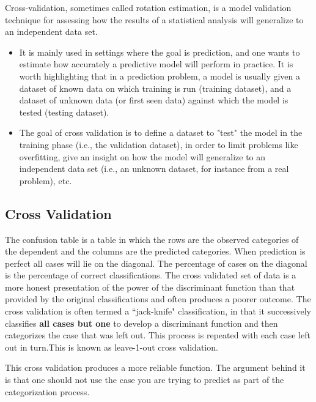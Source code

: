 \documentclass[]{report}
\begin{document}
Cross-validation, sometimes called rotation estimation, is a model validation technique for assessing how the results of a statistical analysis will generalize to an independent data set.
\begin{itemize}
\item It is mainly used in settings where the goal is prediction, and one wants to estimate how accurately a predictive model will perform in practice. It is worth highlighting that in a prediction problem, a model is usually given a dataset of known data on which training is run (training dataset), and a dataset of unknown data (or first seen data) against which the model is tested (testing dataset).
\item The goal of cross validation is to define a dataset to "test" the model in the training phase (i.e., the validation dataset), in order to limit problems like overfitting, give an insight on how the model will generalize to an independent data set (i.e., an unknown dataset, for instance from a real problem), etc.
\end{itemize}

\subsection{Cross Validation}

The confusion
table is a table in which the rows are the observed categories of the dependent and
the columns are the predicted categories. When prediction is perfect all cases will lie on the
diagonal. The percentage of cases on the diagonal is the percentage of correct classifications. 
The cross validated set of data is a more honest presentation of the power of the
discriminant function than that provided by the original classifications and often produces
a poorer outcome. The cross validation is often termed a ``jack-knife" classification, in that
it successively classifies \textbf{all cases but one} to develop a discriminant function and then
categorizes the case that was left out. This process is repeated with each case left out in
turn.This is known as leave-1-out cross validation. 

This cross validation produces a more reliable function. The argument behind it is that
one should not use the case you are trying to predict as part of the categorization process.


\end{document}
